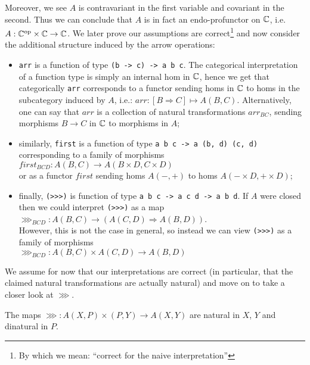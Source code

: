 Moreover, we see $A$ is contravariant in the first variable and covariant in
the second. Thus we can conclude that $A$ is in fact an endo-profunctor on
$\mathbb{C}$, i.e.~$A: {\mathbb{C}}^{\text{op}} \times \mathbb{C} \to \mathbb{C}$. We later prove our
assumptions are correct\footnote{By which we mean: ``correct for the naive
interpretation''} and now consider the additional structure induced by
the arrow operations:

\begin{itemize}
    \item \verb|arr| is a function of type \verb|(b -> c) -> a b c|.
        The categorical interpretation of a function type is simply an internal
        hom in $\mathbb{C}$, hence we get that categorically \verb|arr| corresponds
        to a functor sending homs in $\mathbb{C}$ to homs in the subcategory induced
        by $A$, i.e.: $arr: [B \Rightarrow C] \mapsto A(B, C)$. Alternatively, one
        can say that $arr$ is a collection of natural transformations
        $arr_{BC}$, sending morphisms $B \to C$ in $\mathbb{C}$ to morphisms in $A$;
    \item similarly, \verb|first| is a function of type
        \verb|a b c -> a (b, d) (c, d)|
        corresponding to a family of morphisms\\
        $first_{BCD}: A(B, C) \to A(B \times D,C \times D)$\\
        or as a functor $first$ sending homs $A(-, +)$ to homs $A(- \times D, +
        \times D)$;
    \item finally, \verb|(>>>)| is function of type \verb|a b c -> a c d -> a b d|.
        If $A$ were closed then we could interpret \verb|(>>>)| as a
        map\\
        $\ggg_{BCD}: A(B, C) \to (A(C, D) \Rightarrow A(B, D))$.\\
        However, this is not the case in general, so instead we can view
        \verb|(>>>)| as a family of morphisms\\
        $\ggg_{BCD}: A(B, C) \times A(C, D) \to A(B, D)$\\
\end{itemize}

We assume for now that our interpretations are correct (in particular, that the
claimed natural transformations are actually natural) and move on to take a
closer look at $\ggg$.

\begin{lemma}
    The maps $\ggg: A(X, P) \times (P, Y) \to A(X, Y)$ are natural in $X$,
    $Y$ and dinatural in $P$.
\end{lemma}

